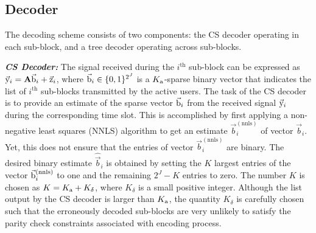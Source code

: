 \documentclass{article}
\begin{document}
\subsection{Decoder}
\label{decoder}
The decoding scheme consists of two components: the CS decoder operating in each sub-block, and a tree decoder operating across sub-blocks.

\textbf{\textit{CS Decoder:}} The signal received during the $i^{\text{th}}$ sub-block can be expressed as $\vec{\mathrm{y}}_i = \mathbf{A}\vec{\mathrm{b}}_i + \vec{\mathrm{z}}_i$,
where $\vec{\mathrm{b}}_i \in \{0,1\}^{2^J}$ is a $K_\mathrm{a}$-sparse binary vector that indicates the list of $i^{\text{th}}$ sub-blocks transmitted by the active users.
The task of the CS decoder is to provide an estimate of the sparse vector $\vec{\mathrm{b}}_i$ from the received signal $\vec{\mathrm{y}}_i$ during the corresponding time slot.
This is accomplished by first applying a non-negative least squares (NNLS) algorithm to get an estimate $\vec{b}^{(\text{nnls})}_i$ of vector $\vec{b}_i$.
Yet, this does not ensure that the entries of vector $\vec{b}^{(\text{nnls})}_i$ are binary.
The desired binary estimate $\hat{\vec{b}}_i$ is obtained by setting the $K$ largest entries of the vector $\vec{\mathrm{b}}^{(\text{nnls})}_i$ to one and the remaining $2^J-K$ entries to zero.
The number $K$ is chosen as $K=K_\mathrm{a}+K_{\delta}$, where $K_{\delta}$ is a small positive integer.
Although the list output by the CS decoder is larger than $K_\mathrm{a}$, the quantity $K_{\delta}$ is carefully chosen such that the erroneously decoded sub-blocks are very unlikely to satisfy the parity check constraints associated with encoding process.
\end{document}
